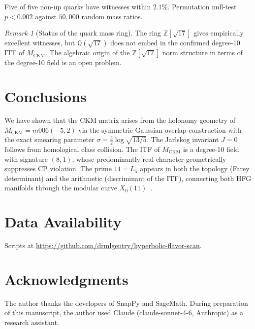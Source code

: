 \documentclass[11pt,a4paper]{article}
\theoremstyle{remark}
\newtheorem{remark}[theorem]{Remark}
\newcommand{\MCKM}{M_{\mathrm{CKM}}}
\newcommand{\QQ}{\mathbb{Q}}
\newcommand{\ZZ}{\mathbb{Z}}
\begin{document}
Five of five non-up quarks have witnesses within $2.1\%$.
Permutation null-test $p < 0.002$ against $50{,}000$ random mass ratios.

\begin{remark}[Status of the quark mass ring]
The ring $\ZZ[\sqrt{17}]$ gives empirically excellent witnesses,
but $\QQ(\sqrt{17})$ does not embed in the confirmed degree-10 ITF
of $\MCKM$. The algebraic origin of the $\ZZ[\sqrt{17}]$ norm
structure in terms of the degree-10 field is an open problem.
\end{remark}

\section{Conclusions}
\label{sec:concl}

We have shown that the CKM matrix arises from the holonomy geometry
of $\MCKM = m006(-5,2)$ via the symmetric Gaussian overlap construction
with the exact smearing parameter $\sigma = \frac{3}{2}\log\sqrt{13/5}$.
The Jarlskog invariant $J=0$ follows from homological class collision.
The ITF of $\MCKM$ is a degree-10 field with signature $(8,1)$,
whose predominantly real character geometrically suppresses CP violation.
The prime $11 = L_5$ appears in both the topology (Farey determinant)
and the arithmetic (discriminant of the ITF), connecting both HFG
manifolds through the modular curve $X_0(11)$~\cite{Gentry:X011}.

\section*{Data Availability}
Scripts at \url{https://github.com/drmlgentry/hyperbolic-flavor-scan}.

\section*{Acknowledgments}
The author thanks the developers of SnapPy and SageMath.
During preparation of this manuscript, the author used Claude
(claude-sonnet-4-6, Anthropic) as a research assistant.
\end{document}
